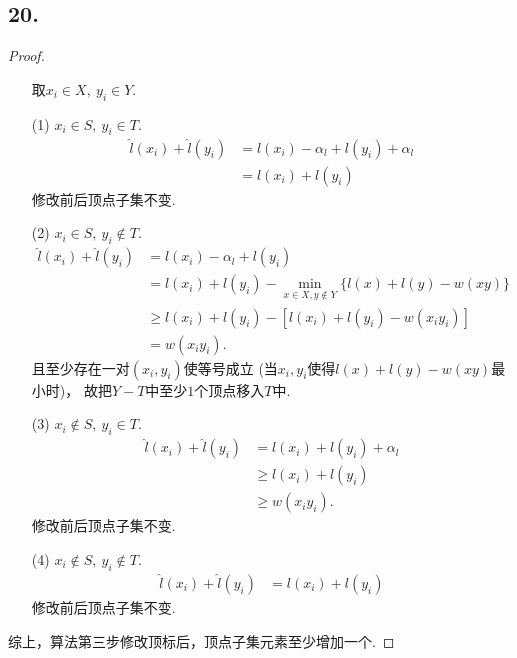 \documentclass{article}
\begin{document}
\subsection*{20.}
\begin{proof}
    \begin{enumerate}
        \item []取$x_i\in X,\ y_i\in Y$.
        \item [(1)]$x_i\in S,\ y_i\in T$.
        \begin{align*}
            \widehat{l}(x_i)+\widehat{l}(y_i)
            &= l(x_i)-\alpha_l+l(y_i)+\alpha_l\\
            &= l(x_i)+l(y_i)
        \end{align*}
        修改前后顶点子集不变.

        \item [(2)]$x_i\in S,\ y_i\notin T$.
        \begin{align*}
            \widehat{l}(x_i)+\widehat{l}(y_i)
            &= l(x_i)-\alpha_l +l(y_i)\\
            &= l(x_i)+l(y_i)- \min\limits_{x\in X,y\notin Y} \{l(x)+l(y)-w(xy) \}\\
            &\geq l(x_i)+l(y_i)- \left[l(x_i)+l(y_i)-w(x_i y_i) \right] \\
            &=w(x_i y_i).
        \end{align*}
        且至少存在一对$(x_i,y_i)$使等号成立 (当$x_i,y_i$使得$l(x)+l(y)-w(xy)$最小时)，
        故把$Y-T$中至少$1$个顶点移入$T$中.

        \item [(3)]$x_i\notin S,\ y_i\in T$.
        \begin{align*}
            \widehat{l}(x_i)+\widehat{l}(y_i)
            &= l(x_i)+l(y_i)+\alpha_{l} \\
            &\geq l(x_i)+l(y_i)\\
            &\geq w(x_i y_i).
        \end{align*}
        修改前后顶点子集不变.

        \item [(4)]$x_i\notin S,\ y_i\notin T$.
        \begin{align*}
            \widehat{l}(x_i)+\widehat{l}(y_i)
            &= l(x_i)+l(y_i)
        \end{align*}
        修改前后顶点子集不变.
    \end{enumerate}
    综上，算法第三步修改顶标后，顶点子集元素至少增加一个.
\end{proof}
\end{document}
